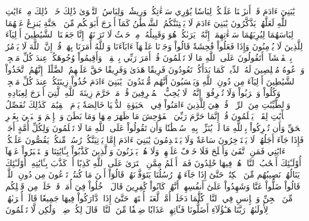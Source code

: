 يَٰبَنِيٓ ءَادَمَ قَدۡ أَنزَلۡنَا عَلَيۡكُمۡ لِبَاسٗا يُوَٰرِي سَوۡءَٰتِكُمۡ وَرِيشٗاۖ وَلِبَاسُ ٱلتَّقۡوَىٰ ذَٰلِكَ خَيۡرٞۚ ذَٰلِكَ مِنۡ ءَايَٰتِ ٱللَّهِ لَعَلَّهُمۡ يَذَّكَّرُونَ
يَٰبَنِيٓ ءَادَمَ لَا يَفۡتِنَنَّكُمُ ٱلشَّيۡطَٰنُ كَمَآ أَخۡرَجَ أَبَوَيۡكُم مِّنَ ٱلۡجَنَّةِ يَنزِعُ عَنۡهُمَا لِبَاسَهُمَا لِيُرِيَهُمَا سَوۡءَٰتِهِمَآۚ إِنَّهُۥ يَرَىٰكُمۡ هُوَ وَقَبِيلُهُۥ مِنۡ حَيۡثُ لَا تَرَوۡنَهُمۡۗ إِنَّا جَعَلۡنَا ٱلشَّيَٰطِينَ أَوۡلِيَآءَ لِلَّذِينَ لَا يُؤۡمِنُونَ
وَإِذَا فَعَلُواْ فَٰحِشَةٗ قَالُواْ وَجَدۡنَا عَلَيۡهَآ ءَابَآءَنَا وَٱللَّهُ أَمَرَنَا بِهَاۗ قُلۡ إِنَّ ٱللَّهَ لَا يَأۡمُرُ بِٱلۡفَحۡشَآءِۖ أَتَقُولُونَ عَلَى ٱللَّهِ مَا لَا تَعۡلَمُونَ
قُلۡ أَمَرَ رَبِّي بِٱلۡقِسۡطِۖ وَأَقِيمُواْ وُجُوهَكُمۡ عِندَ كُلِّ مَسۡجِدٖ وَٱدۡعُوهُ مُخۡلِصِينَ لَهُ ٱلدِّينَۚ كَمَا بَدَأَكُمۡ تَعُودُونَ
فَرِيقًا هَدَىٰ وَفَرِيقًا حَقَّ عَلَيۡهِمُ ٱلضَّلَٰلَةُۚ إِنَّهُمُ ٱتَّخَذُواْ ٱلشَّيَٰطِينَ أَوۡلِيَآءَ مِن دُونِ ٱللَّهِ وَيَحۡسَبُونَ أَنَّهُم مُّهۡتَدُونَ
۞يَٰبَنِيٓ ءَادَمَ خُذُواْ زِينَتَكُمۡ عِندَ كُلِّ مَسۡجِدٖ وَكُلُواْ وَٱشۡرَبُواْ وَلَا تُسۡرِفُوٓاْۚ إِنَّهُۥ لَا يُحِبُّ ٱلۡمُسۡرِفِينَ
قُلۡ مَنۡ حَرَّمَ زِينَةَ ٱللَّهِ ٱلَّتِيٓ أَخۡرَجَ لِعِبَادِهِۦ وَٱلطَّيِّبَٰتِ مِنَ ٱلرِّزۡقِۚ قُلۡ هِيَ لِلَّذِينَ ءَامَنُواْ فِي ٱلۡحَيَوٰةِ ٱلدُّنۡيَا خَالِصَةٗ يَوۡمَ ٱلۡقِيَٰمَةِۗ كَذَٰلِكَ نُفَصِّلُ ٱلۡأٓيَٰتِ لِقَوۡمٖ يَعۡلَمُونَ
قُلۡ إِنَّمَا حَرَّمَ رَبِّيَ ٱلۡفَوَٰحِشَ مَا ظَهَرَ مِنۡهَا وَمَا بَطَنَ وَٱلۡإِثۡمَ وَٱلۡبَغۡيَ بِغَيۡرِ ٱلۡحَقِّ وَأَن تُشۡرِكُواْ بِٱللَّهِ مَا لَمۡ يُنَزِّلۡ بِهِۦ سُلۡطَٰنٗا وَأَن تَقُولُواْ عَلَى ٱللَّهِ مَا لَا تَعۡلَمُونَ
وَلِكُلِّ أُمَّةٍ أَجَلٞۖ فَإِذَا جَآءَ أَجَلُهُمۡ لَا يَسۡتَأۡخِرُونَ سَاعَةٗ وَلَا يَسۡتَقۡدِمُونَ
يَٰبَنِيٓ ءَادَمَ إِمَّا يَأۡتِيَنَّكُمۡ رُسُلٞ مِّنكُمۡ يَقُصُّونَ عَلَيۡكُمۡ ءَايَٰتِي فَمَنِ ٱتَّقَىٰ وَأَصۡلَحَ فَلَا خَوۡفٌ عَلَيۡهِمۡ وَلَا هُمۡ يَحۡزَنُونَ
وَٱلَّذِينَ كَذَّبُواْ بِـَٔايَٰتِنَا وَٱسۡتَكۡبَرُواْ عَنۡهَآ أُوْلَـٰٓئِكَ أَصۡحَٰبُ ٱلنَّارِۖ هُمۡ فِيهَا خَٰلِدُونَ
فَمَنۡ أَظۡلَمُ مِمَّنِ ٱفۡتَرَىٰ عَلَى ٱللَّهِ كَذِبًا أَوۡ كَذَّبَ بِـَٔايَٰتِهِۦٓۚ أُوْلَـٰٓئِكَ يَنَالُهُمۡ نَصِيبُهُم مِّنَ ٱلۡكِتَٰبِۖ حَتَّىٰٓ إِذَا جَآءَتۡهُمۡ رُسُلُنَا يَتَوَفَّوۡنَهُمۡ قَالُوٓاْ أَيۡنَ مَا كُنتُمۡ تَدۡعُونَ مِن دُونِ ٱللَّهِۖ قَالُواْ ضَلُّواْ عَنَّا وَشَهِدُواْ عَلَىٰٓ أَنفُسِهِمۡ أَنَّهُمۡ كَانُواْ كَٰفِرِينَ
قَالَ ٱدۡخُلُواْ فِيٓ أُمَمٖ قَدۡ خَلَتۡ مِن قَبۡلِكُم مِّنَ ٱلۡجِنِّ وَٱلۡإِنسِ فِي ٱلنَّارِۖ كُلَّمَا دَخَلَتۡ أُمَّةٞ لَّعَنَتۡ أُخۡتَهَاۖ حَتَّىٰٓ إِذَا ٱدَّارَكُواْ فِيهَا جَمِيعٗا قَالَتۡ أُخۡرَىٰهُمۡ لِأُولَىٰهُمۡ رَبَّنَا هَـٰٓؤُلَآءِ أَضَلُّونَا فَـَٔاتِهِمۡ عَذَابٗا ضِعۡفٗا مِّنَ ٱلنَّارِۖ قَالَ لِكُلّٖ ضِعۡفٞ وَلَٰكِن لَّا تَعۡلَمُونَ
